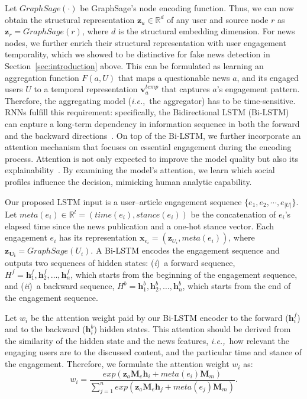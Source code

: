 \documentclass[sigconf]{acmart}
\theoremstyle{definition}
\theoremstyle{hypothesis}
\begin{document}
Let $GraphSage(\cdot)$ be GraphSage's node encoding function. Thus, we can now obtain the structural representation $\boldsymbol{z}_u\in \mathbb{R}^d$ of any user and source node $r$ as $\boldsymbol{z}_r=GraphSage(r)$, where $d$ is the structural embedding dimension. For news nodes, we further enrich their structural representation with user engagement temporality, which we showed to be distinctive for fake news detection in Section~\ref{sec:introduction} above. This can be formulated as learning an aggregation function $F(a,U)$ that maps a questionable news $a$, and its engaged users $U$ to a temporal representation $\boldsymbol{v}^{temp}_{a}$ that captures $a$'s engagement pattern. Therefore, the aggregating model (\textit{i.e.},~the aggregator) has to be time-sensitive. 
RNNs fulfill this requirement: specifically, the Bidirectional LSTM (Bi-LSTM) can capture a long-term dependency in information sequence in both the forward and the backward directions~\cite{lstm1997hochreiter}. On top of the Bi-LSTM, we further incorporate an attention mechanism that focuses on essential engagement during the encoding process. Attention is not only expected to improve the model quality but also its explainability~\cite{luong2015effective,devlin2019bert}. By examining the model's attention, we learn which social profiles influence the decision, mimicking human analytic capability. 

Our proposed LSTM input is a user--article engagement sequence $\{e_1, e_2,\cdots,e_{|U|}\}$. Let $meta(e_i)\in \mathbb{R}^l=(time(e_i),stance(e_i))$ be the concatenation of $e_i$'s elapsed time since the news publication and a one-hot stance vector. Each engagement $e_i$ has its representation $\boldsymbol{x}_{e_i}= (\boldsymbol{z}_{U_i}, meta(e_i))$, where $\boldsymbol{z_{U_i}}=GraphSage(U_i)$. A Bi-LSTM encodes the engagement sequence and outputs two sequences of hidden states: (\emph{i})~a forward sequence,
$H^f={\boldsymbol{h}^f_1, \boldsymbol{h}^f_2,\ldots,
  \boldsymbol{h}^f_n}$, which starts from the beginning of the engagement sequence, and
(\emph{ii})~a backward sequence, $H^b={\boldsymbol{h}^b_1,
  \boldsymbol{h}^b_2,\ldots, \boldsymbol{h}^b_n}$, which starts from the
end of the engagement sequence. 

Let $w_i$ be the attention weight paid by our Bi-LSTM encoder to the forward ($\boldsymbol{h}^f_i$) and to the backward ($\boldsymbol{h}^b_i$) hidden states. This attention should be derived from the similarity of the hidden state and the news features, \textit{i.e.,}~how relevant the engaging users are to the discussed content, and the particular time and stance of the engagement. Therefore, we formulate the attention weight $w_i$ as:
\begin{equation}
    w_i = \frac{exp(\boldsymbol{z}_a \mathbf{M}_e  \boldsymbol{h}_i + meta(e_i) \mathbf{M}_m)}{\sum^n_{j=1}exp(\boldsymbol{z}_a \mathbf{M}_e \boldsymbol{h}_j + meta(e_j) \mathbf{M}_m)}.
\end{equation}
\end{document}
